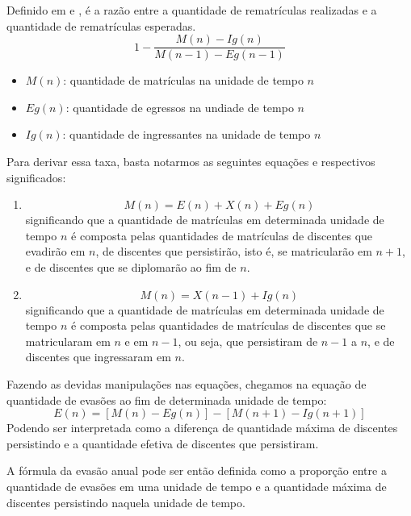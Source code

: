 \documentclass{report}
\begin{document}
Definido em \cite{esclarecimentos_calculos} e \cite{mudanca_calculos}, é a razão entre a quantidade de rematrículas realizadas e a quantidade de rematrículas esperadas.
\begin{equation}
1 - \frac{M(n) - Ig(n)}{M(n-1) - Eg(n-1)}
\end{equation}
\begin{itemize}
\item $M(n)$: quantidade de matrículas na unidade de tempo $n$
\item $Eg(n)$: quantidade de egressos na undiade de tempo $n$
\item $Ig(n)$: quantidade de ingressantes na unidade de tempo $n$
\end{itemize}

Para derivar essa taxa, basta notarmos as seguintes equações e respectivos significados:
\begin{enumerate}
\item 
\begin{equation}
M(n) = E(n) + X(n) + Eg(n)
\end{equation}
significando que a quantidade de matrículas em determinada unidade de tempo $n$ é composta pelas quantidades de matrículas de discentes que evadirão em $n$, de discentes que persistirão, isto é, se matricularão em $n+1$, e de discentes que se diplomarão ao fim de $n$.
\item 
\begin{equation}
M(n) = X(n-1) + Ig(n)
\end{equation}
significando que a quantidade de matrículas em determinada unidade de tempo $n$ é composta pelas quantidades de matrículas de discentes que se matricularam em $n$ e em $n-1$, ou seja, que persistiram de $n-1$ a $n$, e de discentes que ingressaram em $n$.
\end{enumerate}

Fazendo as devidas manipulações nas equações, chegamos na equação de quantidade de evasões ao fim de determinada unidade de tempo:
\begin{equation}
E(n) = [M(n) - Eg(n)] - [M(n+1) - Ig(n+1)]
\end{equation}
Podendo ser interpretada como a diferença de quantidade máxima de discentes persistindo e a quantidade efetiva de discentes que persistiram.

A fórmula da evasão anual pode ser então definida como a proporção entre a quantidade de evasões em uma unidade de tempo e a quantidade máxima de discentes persistindo naquela unidade de tempo.
\end{document}

